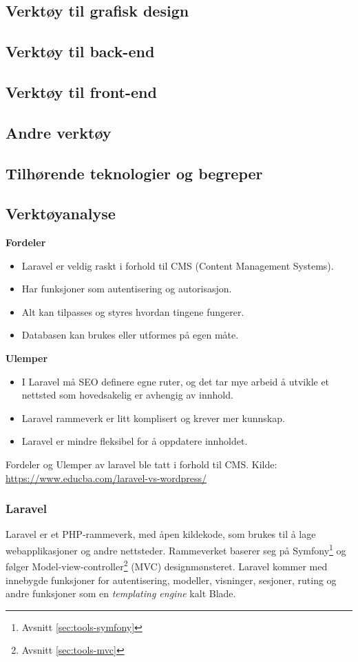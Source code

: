 \subsection{Verktøy til grafisk design}
\subsection{Verktøy til back-end}
\subsection{Verktøy til front-end}
\subsection{Andre verktøy}
\subsection{Tilhørende teknologier og begreper}
\subsection{Verktøyanalyse}

\textbf{Fordeler}
\begin{itemize}
    \item Laravel er veldig raskt i forhold til CMS (Content Management Systems).
    \item Har funksjoner som autentisering og autorisasjon.
    \item Alt kan tilpasses og styres hvordan tingene fungerer.
    \item Databasen kan brukes eller utformes på egen måte.
\end{itemize}

\textbf{Ulemper}
\begin{itemize}
    \item I Laravel må SEO definere egne ruter, og det tar mye arbeid å utvikle et nettsted som hovedsakelig er avhengig av innhold.
    \item Laravel rammeverk er litt komplisert og krever mer kunnskap.
    \item Laravel er mindre fleksibel for å oppdatere innholdet.
\end{itemize}

Fordeler og Ulemper av laravel ble tatt i forhold til CMS.
Kilde: \url{https://www.educba.com/laravel-vs-wordpress/}

\subsubsection{Laravel}
Laravel \cite{cbcp2019lvw} er et PHP-rammeverk, med åpen kildekode, som brukes til å lage webapplikasjoner og andre nettsteder. Rammeverket baserer seg på Symfony\footnote{Avsnitt \ref{sec:tools-symfony}} og følger Model-view-controller\footnote{Avsnitt \ref{sec:tools-mvc}} (MVC) designmønsteret.
Laravel kommer med innebygde funksjoner for autentisering, modeller, visninger, sesjoner, ruting og andre funksjoner som en \textit{templating engine} kalt Blade.


